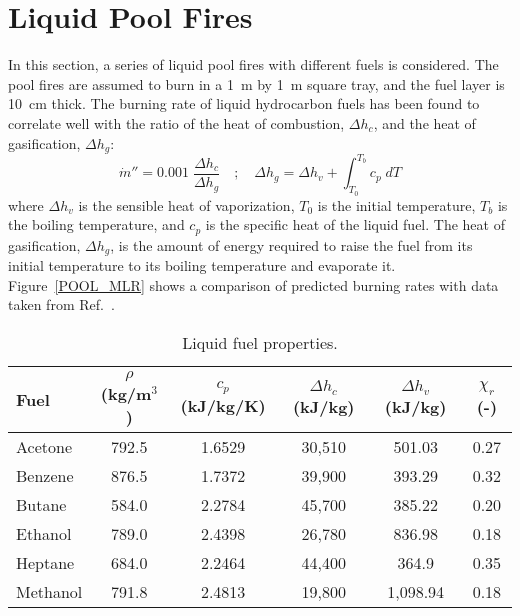 \section{Liquid Pool Fires}

In this section, a series of liquid pool fires with different fuels is considered. The pool fires are assumed to burn in a 1~m by 1~m square tray, and the fuel layer is 10~cm thick. The burning rate of liquid hydrocarbon fuels has been found to correlate well with the ratio of the heat of combustion, $\Delta h_c$, and the heat of gasification, $\Delta h_g$:
\begin{equation}
\dot{m}''= 0.001 \; \frac{\Delta h_c}{\Delta h_g} \quad ; \quad \Delta h_g = \Delta h_v + \int_{T_0}^{T_b} c_p \; dT
\end{equation}
where $\Delta h_v$ is the sensible heat of vaporization, $T_0$ is the initial temperature, $T_b$ is the boiling temperature, and $c_p$ is the specific heat of the liquid fuel. The heat of gasification, $\Delta h_g$, is the amount of energy required to raise the fuel from its initial temperature to its boiling temperature and evaporate it. Figure~\ref{POOL_MLR} shows a comparison of predicted burning rates with data taken from Ref.~\cite{SFPE}.

\begin{table}[h!]
\begin{center}
\begin{tabular}{|l|c|c|c|c|c|} \hline
Fuel & $\rho$ (kg/m$^3$) & $c_p$ (kJ/kg/K)  & $\Delta h_c$ (kJ/kg) & $\Delta h_v$ (kJ/kg) & $\chi_r$ (-) \\ \hline \hline
Acetone &  792.5   &  1.6529    &   30,510  &  501.03   & 0.27  \\ \hline
Benzene &  876.5   &  1.7372    &   39,900  &   393.29  & 0.32  \\ \hline
Butane  &  584.0   &  2.2784    &   45,700  &   385.22  & 0.20  \\ \hline
Ethanol &  789.0   &  2.4398    &   26,780  &    836.98 & 0.18  \\ \hline
Heptane &  684.0   &  2.2464    &   44,400  &    364.9  & 0.35  \\ \hline
Methanol & 791.8   &  2.4813    &   19,800  &  1,098.94 & 0.18  \\ \hline
\end{tabular}
\caption{Liquid fuel properties.}
\end{center}
\end{table}

